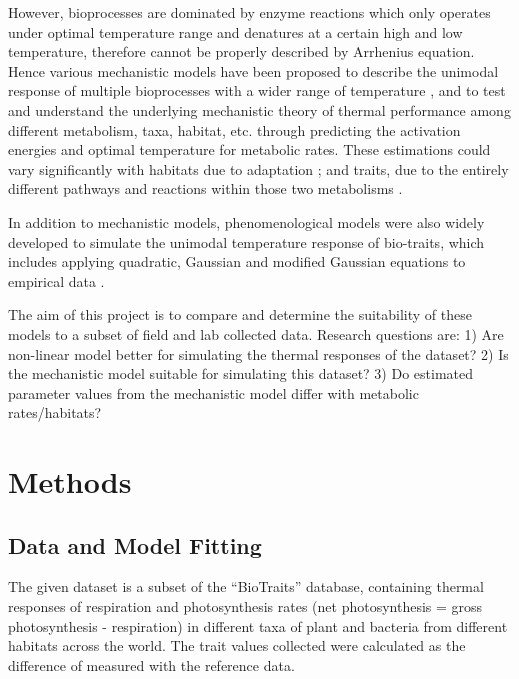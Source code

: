 \documentclass[11pt, a4paper]{article}
\begin{document}
\begin{spacing}{1.5}
However, bioprocesses are dominated by enzyme reactions which only operates under optimal temperature range and denatures at a certain high and low temperature, therefore cannot be properly described by Arrhenius equation. Hence various mechanistic models have been proposed to describe the unimodal response of multiple bioprocesses with a wider range of temperature \citep{johnson1946growth, rezende2019thermal, schoolfield1981non}, and to test and understand the underlying mechanistic theory of thermal performance among different metabolism, taxa, habitat, etc. \citep{dell2011systematic} through predicting the activation energies and optimal temperature for metabolic rates. These estimations could vary significantly with habitats due to adaptation \citep{sage2007temperature}; and traits, due to the entirely different pathways and reactions within those two metabolisms \citep{raven2005biology, ABEDON20083010}.

In addition to mechanistic models, phenomenological models \citep{ratkowsky1983model, boatman2017key, briere1999novel} were also widely developed to simulate the unimodal temperature response of bio-traits, which includes applying quadratic, Gaussian and modified Gaussian equations to empirical data \citep{montagnes2008short}. 

The aim of this project is to compare and determine the suitability of these models to a subset of field and lab collected data. Research questions are: 1) Are non-linear model better for simulating the thermal responses of the dataset? 2) Is the mechanistic model suitable for simulating this dataset? 3) Do estimated parameter values from the mechanistic model differ with metabolic rates/habitats?   

\section{Methods}

\subsection{Data and Model Fitting}

The given dataset is a subset of the “BioTraits” database, containing thermal responses of respiration and photosynthesis rates (net photosynthesis = gross photosynthesis - respiration) in different taxa of plant and bacteria from different habitats across the world. The trait values collected were calculated as the difference of measured with the reference data. 


\end{spacing}
\end{document}
